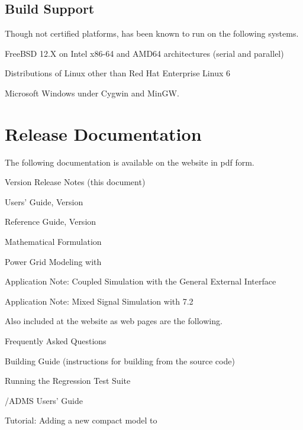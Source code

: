 \documentclass[letterpaper]{scrartcl}
\begin{document}
\subsection*{Build Support}
Though not certified platforms, \Xyce{} has been known to run on the following
systems.
\begin{XyceItemize}
  \item FreeBSD 12.X on Intel x86-64 and AMD64 architectures (serial
    and parallel)
  \item Distributions of Linux other than Red Hat Enterprise Linux 6
  \item Microsoft Windows under Cygwin and MinGW.
\end{XyceItemize}


\section{\Xyce{} Release \XyceVersionVar{} Documentation}
The following \Xyce{} documentation is available on the \Xyce{} website in pdf
form.
\begin{XyceItemize}
  \item \Xyce{} Version \XyceVersionVar{} Release Notes (this document)
  \item \Xyce{} Users' Guide, Version \XyceVersionVar{}
  \item \Xyce{} Reference Guide, Version \XyceVersionVar{}
  \item \Xyce{} Mathematical Formulation
  \item Power Grid Modeling with \Xyce{}
  \item Application Note: Coupled Simulation with the \Xyce{} General
    External Interface
  \item Application Note: Mixed Signal Simulation with \Xyce{} 7.2
\end{XyceItemize}
Also included at the \Xyce{} website as web pages are the following.
\begin{XyceItemize}
  \item Frequently Asked Questions
  \item Building Guide (instructions for building \Xyce{} from the source code)
  \item Running the \Xyce{} Regression Test Suite
  \item \Xyce{}/ADMS Users' Guide
  \item Tutorial:  Adding a new compact model to \Xyce{}
\end{XyceItemize}
\end{document}
